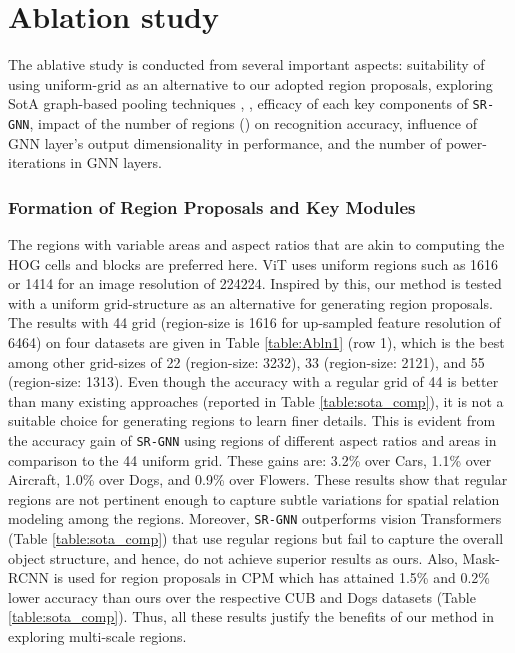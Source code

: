\documentclass[journal]{IEEEtran}
\begin{document}
\section {Ablation study}  \label{Ablation}
The ablative study is conducted from several important aspects: suitability of using uniform-grid as an alternative to our adopted region proposals, exploring SotA graph-based pooling techniques \cite{xu2018powerful}, \cite{zhang2018end}, efficacy of each key components of \texttt{SR-GNN}, impact of the number of regions () on recognition accuracy, influence of GNN layer's output dimensionality in performance, and the number of power-iterations in GNN layers. 

\subsubsection{Formation of Region Proposals and Key Modules} 
The regions with variable areas and aspect ratios that are akin to computing the HOG cells and blocks are preferred here. 
ViT uses uniform regions such as  1616 or 1414 for an image resolution of 224224. Inspired by this, our method is tested  with a uniform grid-structure as an alternative for generating region proposals. The results with 44 grid (region-size is 1616 for up-sampled feature resolution of 6464) on four datasets are given in Table \ref{table:Abln1} (row 1), which is the best among other grid-sizes of 22 (region-size: 3232), 33 (region-size: 2121), and 55 (region-size:  1313). Even though the accuracy with a regular grid of 44 is better than many existing approaches (reported in Table \ref{table:sota_comp}), it is not a suitable choice for generating regions to learn finer details. This is evident from the accuracy gain of \texttt{SR-GNN} using regions of different aspect ratios and areas in comparison to the 44 uniform grid. These gains are: 3.2\% over Cars, 1.1\% over Aircraft, 1.0\% over Dogs, and 0.9\% over Flowers. These results show that regular regions are not pertinent enough to capture subtle variations for spatial relation modeling among the regions. Moreover, \texttt{SR-GNN} outperforms vision Transformers (Table \ref{table:sota_comp}) that use regular regions but fail to capture the overall object structure, and hence, do not achieve superior results as ours. Also, Mask-RCNN is used for region proposals in CPM \cite{ge2019weakly} which has attained 1.5\% and 0.2\% lower accuracy than ours over the respective CUB and Dogs datasets (Table \ref{table:sota_comp}). Thus, all these results justify the benefits of our method in exploring multi-scale regions. 
\end{document}
